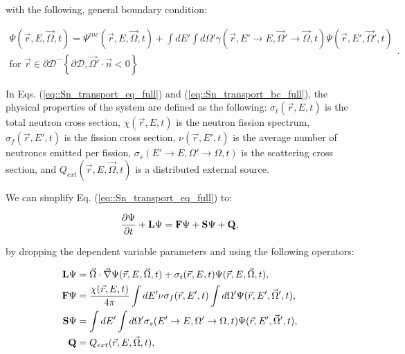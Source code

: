 \noindent with the following, general boundary condition:

\begin{equation}
\label{eq::Sn_transport_bc_full}
\begin{aligned}
	\Psi (\vec{r}, E, \vec{\Omega},t) = \Psi^{inc} (\vec{r}, E, \vec{\Omega},t) + \int dE' \int d\Omega' \gamma (\vec{r}, E' \rightarrow E, \vec{\Omega}' \rightarrow \vec{\Omega},t) \Psi (\vec{r}, E', \vec{\Omega}',t) \\
	\text{for } \vec{r} \in \partial \mathcal{D}^{-} \left\{   \partial \mathcal{D}, \vec{\Omega}' \cdot \vec{n} < 0  \right\}
\end{aligned} .
\end{equation}

\noindent In Eqs. (\ref{eq::Sn_transport_eq_full}) and (\ref{eq::Sn_transport_bc_full}), the physical properties of the system are defined as the following: $\sigma_t (\vec{r}, E,t)$ is the total neutron cross section, $\chi (\vec{r}, E,t)$ is the neutron fission spectrum, $\sigma_f (\vec{r}, E',t)$ is the fission cross section, $\nu (\vec{r}, E',t)$ is the average number of neutroncs emitted per fission, $\sigma_s (E' \rightarrow E, \Omega' \rightarrow \Omega,t)$ is the scattering cross section, and $Q_{ext} (\vec{r}, E, \vec{\Omega},t)$ is a distributed external source. 

We can simplify Eq. (\ref{eq::Sn_transport_eq_full}) to:

\begin{equation}
\label{eq::Sn_transport_eq_op}
	\frac{\partial \Psi}{\partial t} + {\bf L} \Psi =  {\bf F} \Psi  + {\bf S} \Psi + {\bf Q},
\end{equation}

\noindent by dropping the dependent variable parameters and using the following operators:

\begin{equation}
\label{eq::Sn_transport_operators}
\begin{aligned}
	{\bf L} \Psi &= \vec{\Omega} \cdot \vec{\nabla} \Psi (\vec{r}, E, \vec{\Omega},t)+ \sigma_t (\vec{r}, E,t) \Psi (\vec{r}, E, \vec{\Omega},t), \\
	{\bf F} \Psi &= \frac{\chi (\vec{r}, E,t)}{4 \pi} \int dE' \nu \sigma_f (\vec{r}, E',t) \int d\Omega' \Psi (\vec{r}, E', \vec{\Omega}',t), \\
	{\bf S} \Psi &= \int dE' \int d\Omega' \sigma_s (E' \rightarrow E, \Omega' \rightarrow \Omega, t) \Psi (\vec{r}, E', \vec{\Omega}', t),  \\
	{\bf Q}       & = Q_{ext} (\vec{r}, E, \vec{\Omega},t) ,
\end{aligned}
\end{equation}

